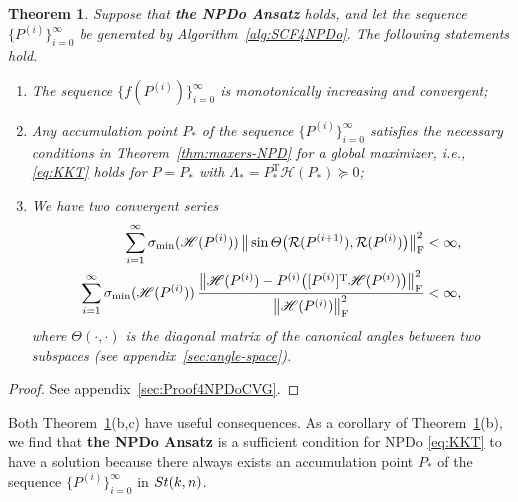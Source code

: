 \documentclass[11pt]{article}
\def\scrH{\mathscr{H}}
\def\cR{{\cal R}}
\newcommand\STM[2]{{\rm St}(#1,#2)}
\DeclareMathOperator{\tr}{tr}
\DeclareMathOperator{\F}{F}
\DeclareMathOperator{\T}{T}
\newtheorem{theorem}{Theorem}[section]
\theoremstyle{definition}
\numberwithin{equation}{section}
\begin{document}
\begin{theorem}\label{thm:cvg4SCF4NPDo}
Suppose that {\bf the NPDo Ansatz} holds, and let the sequence $\{P^{(i)}\}_{i=0}^{\infty}$ be generated by Algorithm~\ref{alg:SCF4NPDo}.
The following statements hold.
\begin{enumerate}[{\rm (a)}]
  \item The sequence $\{f(P^{(i)})\}_{i=0}^{\infty}$ is monotonically increasing and convergent;
  \item Any accumulation point $P_*$ of the sequence $\{P^{(i)}\}_{i=0}^{\infty}$ satisfies
        the necessary conditions in Theorem~\ref{thm:maxers-NPD} for a global maximizer, i.e.,
        \eqref{eq:KKT} holds for $P=P_*$ with $\Lambda_*=P_*^{\T}\scrH(P_*)\succeq 0$;
  \item We have two convergent series
        \begin{subequations}\label{eq:cvg4SCF4NPDo:series}
        \begin{align}
         \sum_{i=1}^{\infty}\sigma_{\min}(\scrH(P^{(i)}))\,\big\|\sin\Theta\big(\cR(P^{(i+1)}),\cR(P^{(i)})\big)\big\|_{\F}^2
                      &<\infty,    \label{eq:cvg4SCF4NPDo:series-1} \\
        \sum_{i=1}^{\infty}\sigma_{\min}(\scrH(P^{(i)}))\,
                  \frac {\big\|\scrH(P^{(i)})-P^{(i)}\big([P^{(i)}]^{\T}\scrH(P^{(i)})\big)\big\|_{\F}^2}
                        {\big\|\scrH(P^{(i)})\big\|_{\F}^2}
                      &<\infty,                 \label{eq:cvg4SCF4NPDo:series-2}
        \end{align}
        \end{subequations}
        where $\Theta(\cdot,\cdot)$ is the diagonal matrix of the canonical angles between two subspaces (see appendix~\ref{sec:angle-space}).
\end{enumerate}
\end{theorem}

\begin{proof}
See appendix~\ref{sec:Proof4NPDoCVG}.
\end{proof}

Both  Theorem~\ref{thm:cvg4SCF4NPDo}(b,c) have useful consequences.
As a corollary of Theorem~\ref{thm:cvg4SCF4NPDo}(b), we find that
{\bf the NPDo Ansatz} is a sufficient condition for NPDo \eqref{eq:KKT} to have a solution because
there always exists an accumulation point $P_*$ of the sequence $\{P^{(i)}\}_{i=0}^{\infty}$
in $\STM{k}{n}$.
\end{document}

